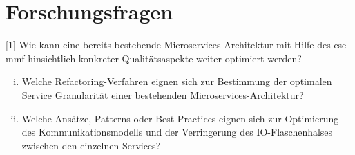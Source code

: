 \chapter{Forschungsfragen}
\label{chap:forschungsfragen}

[1] Wie kann eine bereits bestehende Microservices-Architektur mit Hilfe des \acrfull{ese-mmf} hinsichtlich konkreter Qualitätsaspekte weiter optimiert werden?
\begin{enumerate}[i.]
	\item Welche Refactoring-Verfahren eignen sich zur Bestimmung der optimalen Service Granularität einer bestehenden Microservices-Architektur?
	\item Welche Ansätze, Patterns oder Best Practices eignen sich zur Optimierung des Kommunikationsmodells und der Verringerung des IO-Flaschenhalses zwischen den einzelnen Services?
\end{enumerate}
